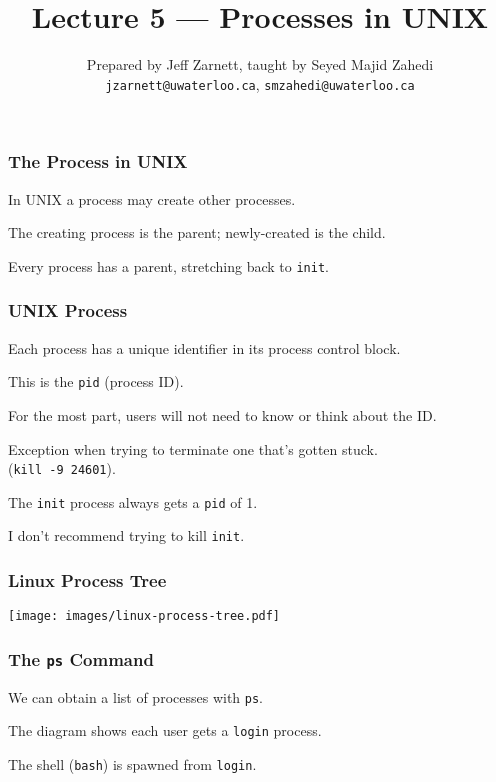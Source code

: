 

\title{Lecture 5 --- Processes in UNIX}

\author{Prepared by Jeff Zarnett, taught by Seyed Majid Zahedi \\ \small \texttt{jzarnett@uwaterloo.ca}, \texttt{smzahedi@uwaterloo.ca}}
\date{}




\begin{frame}
	\titlepage

\end{frame}

\begin{frame}
	\frametitle{The Process in UNIX}

	In UNIX a process may create other processes.

	The creating process is the parent; newly-created is the child.

	Every process has a parent, stretching back to \texttt{init}.

\end{frame}


\begin{frame}
	\frametitle{UNIX Process}
	Each process has a unique identifier in its process control block.

	This is the \texttt{pid} (process ID).

	For the most part, users will not need to know or think about the ID.

	Exception when trying to terminate one that's gotten stuck.\\
	\quad (\texttt{kill -9 24601}).

	The \texttt{init} process always gets a \texttt{pid} of 1.

	I don't recommend trying to kill \texttt{init}.

\end{frame}

\begin{frame}
	\frametitle{Linux Process Tree}

	\begin{center}
		\texttt{[image: images/linux-process-tree.pdf]}
	\end{center}

\end{frame}

\begin{frame}
	\frametitle{The \texttt{ps} Command}

	We can obtain a list of processes with \texttt{ps}.

	The diagram shows each user gets a \texttt{login} process.

	The shell (\texttt{bash}) is spawned from \texttt{login}.

\end{frame}

